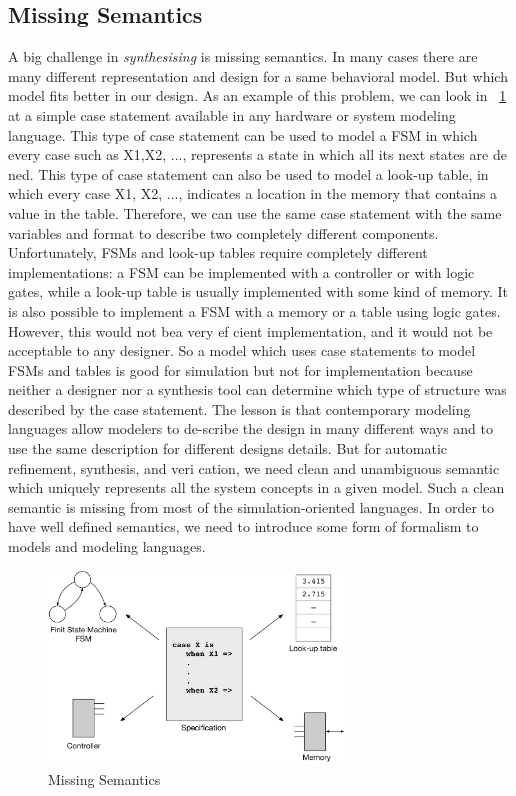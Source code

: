 \subsection{Missing Semantics}
\label{sec:missing_semantics}

A big challenge in \emph{synthesising} is missing semantics. In many cases there are many different representation and design for a same behavioral model. But which model fits better in our design. 
As an example of this problem, we can look in ~\ref{fig:missing_semantics} at a simple case statement available in any hardware or system modeling language.
This type of case statement can be used to model a FSM in which every case such as X1,X2, ..., represents a state in which all its next states are de ned.
This type of case statement can also be used to model a look-up table, in which every case X1, X2, ..., indicates a location in the memory that contains a value in the table.
Therefore,  we can use the same case statement with the same variables and format to describe two completely different components.
Unfortunately, FSMs and look-up tables require completely different implementations:  a FSM can be implemented with a controller or with logic gates, while a look-up table is usually implemented with some kind of memory.
It is also possible to implement a FSM with a memory or a table using logic gates.
However, this would not bea very ef cient implementation, and it would not be acceptable to any designer.
So a model which uses case statements to model FSMs and tables is good for simulation but not for implementation because neither a designer nor a synthesis tool can determine which type of structure was described by the case statement.
The lesson is that contemporary modeling languages allow modelers to de-scribe the design in many different ways and to use the same description for different designs details. But for automatic refinement, synthesis, and veri cation, we need clean and unambiguous semantic which uniquely represents all the system concepts in a given model.  Such a clean semantic is missing from most of the simulation-oriented  languages.
In order to have well defined semantics, we need to introduce some form of formalism to models and modeling languages.


\begin{figure}[h]
    \centering
    \includegraphics[width=0.7\textwidth]{figures/Introduction/Missing_Semantics.pdf}
    \caption{Missing Semantics}
    \label{fig:missing_semantics}
\end{figure}


